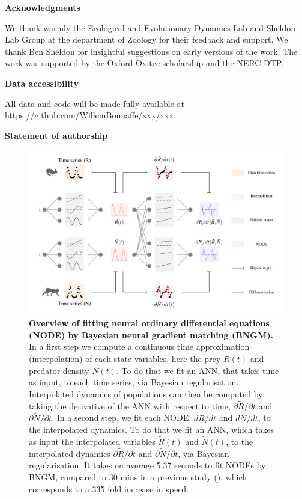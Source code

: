 \documentclass[11pt, oneside]{article}
\begin{document}
\textbf{Acknowledgments}

We thank warmly the Ecological and Evolutionary Dynamics Lab and Sheldon Lab Group at the department of Zoology for their feedback and support.
We thank Ben Sheldon for insightful suggestions on early versions of the work.
The work was supported by the Oxford-Oxitec scholarship and the NERC DTP.

\textbf{Data accessibility}

All data and code will be made fully available at https://github.com/WillemBonnaffe/xxx/xxx.

\textbf{Statement of authorship}


\printbibliography 

\newpage
{}

\newpage
\begin{figure}[H]
\includegraphics[width=\linewidth,page=1]{figures/main.pdf}
\caption{
    \textbf{Overview of fitting neural ordinary differential equations (NODE) by Bayesian neural gradient matching (BNGM).}
    In a first step we compute a continuous time approximation (interpolation) of each state variables, here the prey $\tilde{R}(t)$ and predator density $\tilde{N}(t)$.
    To do that we fit an ANN, that takes time as input, to each time series, via Bayesian regularisation.
    Interpolated dynamics of populations can then be computed by taking the derivative of the ANN with respect to time, $\partial\tilde{R}/\partial t$ and $\partial\tilde{N}/\partial t$.
    In a second step, we fit each NODE, $dR/dt$ and $dN/dt$, to the interpolated dynamics.
    To do that we fit an ANN, which takes as input the interpolated variables $\tilde{R}(t)$ and $\tilde{N}(t)$, to the interpolated dynamics $\partial\tilde{R}/\partial t$ and $\partial\tilde{N}/\partial t$, via Bayesian regularisation.
    It takes on average 5.37 seconds to fit NODEs by BNGM, compared to 30 mins in a previous study (\cite{Bonnaffe2021a}), which corresponds to a 335 fold increase in speed.
}
\end{figure}
\newpage
\end{document}
